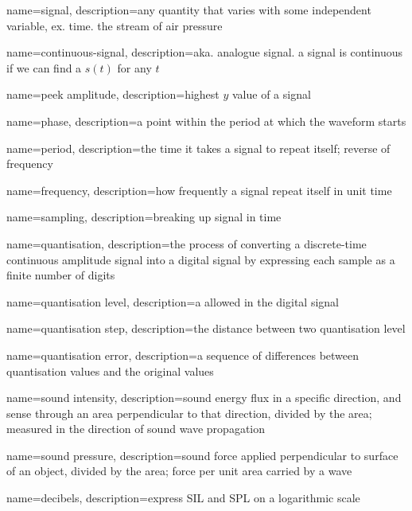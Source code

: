 {
  name=signal,
  description={any quantity that varies with some independent variable, ex. time.
  the stream of air pressure}
}

{
  name=continuous-signal,
  description={aka. analogue signal. a signal is continuous if we can find
  a $ s \left( t \right) $ for any $ t $}
}

{
  name=peek amplitude,
  description={highest $ y $ value of a signal}
}

{
  name=phase,
  description={a point within the period at which the waveform starts}
}

{
  name=period,
  description={the time it takes a signal to repeat itself; reverse of
  frequency}
}

{
  name=frequency,
  description={how frequently a signal repeat itself in unit time}
}

{
  name=sampling,
  description={breaking up signal in time}
}

{
  name=quantisation,
  description={the process of converting a discrete-time continuous amplitude
  signal into a digital signal by expressing each sample as a finite number
  of digits}
}

{
  name=quantisation level,
  description={a allowed in the digital signal}
}

{
  name=quantisation step,
  description={the distance between two quantisation level}
}

{
  name=quantisation error,
  description={a sequence of differences between quantisation values and the
  original values}
}

{
  name=sound intensity,
  description={sound energy flux in a specific direction, and sense through an
  area perpendicular to that direction, divided by the area; measured in
  the direction of sound wave propagation}
}

{
  name=sound pressure,
  description={sound force applied perpendicular to surface of an object,
  divided by the area; force per unit area carried by a wave}
}


{
  name=decibels,
  description={express SIL and SPL on a logarithmic scale}
}

